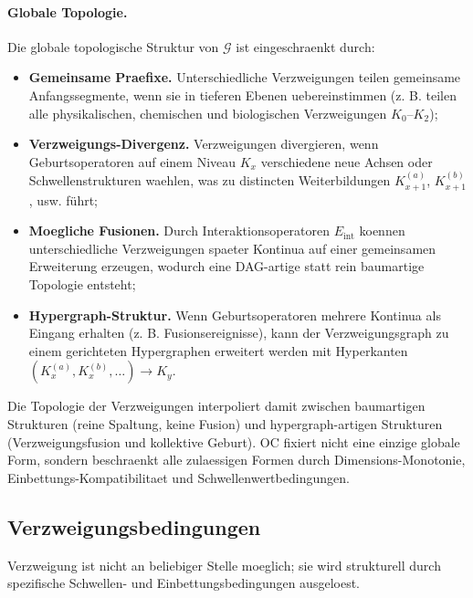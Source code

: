 \paragraph{Globale Topologie.}
Die globale topologische Struktur von \(\mathcal{G}\) ist eingeschraenkt durch:
\begin{itemize}
  \item \textbf{Gemeinsame Praefixe.}\quad
        Unterschiedliche Verzweigungen teilen gemeinsame Anfangssegmente, wenn sie
        in tieferen Ebenen uebereinstimmen (z. B. teilen alle physikalischen,
        chemischen und biologischen Verzweigungen \(K_0\)–\(K_2\));
  \item \textbf{Verzweigungs-Divergenz.}\quad
        Verzweigungen divergieren, wenn Geburtsoperatoren auf einem Niveau \(K_x\)
        verschiedene neue Achsen oder Schwellenstrukturen waehlen, was zu
distincten Weiterbildungen \(K_{x+1}^{(a)}\), \(K_{x+1}^{(b)}\), usw. führt;
  \item \textbf{Moegliche Fusionen.}\quad
        Durch Interaktionsoperatoren \(E_{\mathrm{int}}\) koennen unterschiedliche
        Verzweigungen spaeter Kontinua auf einer gemeinsamen Erweiterung erzeugen,
        wodurch eine DAG-artige statt rein baumartige Topologie entsteht;
  \item \textbf{Hypergraph-Struktur.}\quad
        Wenn Geburtsoperatoren mehrere Kontinua als Eingang erhalten (z. B.
        Fusionsereignisse), kann der Verzweigungsgraph zu einem gerichteten
        Hypergraphen erweitert werden mit Hyperkanten
        \((K_{x}^{(a)}, K_{x}^{(b)},\dots) \to K_{y}\).
\end{itemize}

Die Topologie der Verzweigungen interpoliert damit zwischen baumartigen
Strukturen (reine Spaltung, keine Fusion) und hypergraph-artigen Strukturen
(Verzweigungsfusion und kollektive Geburt). OC fixiert nicht eine einzige
globale Form, sondern beschraenkt alle zulaessigen Formen durch
Dimensions-Monotonie, Einbettungs-Kompatibilitaet und
Schwellenwertbedingungen.

\subsection{Verzweigungsbedingungen}

Verzweigung ist nicht an beliebiger Stelle moeglich; sie wird strukturell durch
spezifische Schwellen- und Einbettungsbedingungen ausgeloest.

